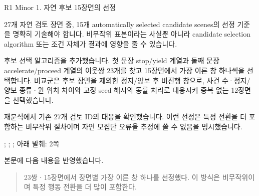 \clearpage

\begin{reviewitem}{R1 Minor 1. 자연 후보 15장면의 선정}

\begin{reviewercomment}

27개 자연 검토 장면 중, 15개 automatically selected candidate scenes의 선정 기준을 명확히 기술해야 합니다. 비무작위 표본이라는 사실뿐 아니라 candidate selection algorithm 또는 조건 자체가 결과에 영향을 줄 수 있습니다.

\end{reviewercomment}

\begin{authorresponse}

후보 선택 알고리즘을 추가했습니다. 첫 문장 stop/yield 계열과 둘째 문장 accelerate/proceed 계열의 이웃쌍 23개를 찾고 15장면에서 가장 이른 창 하나씩을 선택합니다. 비교군은 후보 장면을 제외한 정지/양보 후 비진행 창으로, 사건 수·정지/양보 종류·원 위치 차이와 고정 seed 해시의 동률 처리로 대응시켜 중복 없는 12장면을 선택했습니다.

재분석에서 기존 27개 검토 ID의 대응을 확인했습니다. 이런 선정은 특정 전환을 더 포함하는 비무작위 절차이며 자연 모집단 오류율 추정에 쓸 수 없음을 명시했습니다.

\end{authorresponse}

\begin{manuscriptrevision}{; ; ; 아래 발췌: 2쪽}

본문에 다음 내용을 반영했습니다.

\begin{quote}

23쌍ㆍ15장면에서 장면별 가장 이른 창 하나를 선정했다. 이 방식은 비무작위이며 특정 행동 전환을 더 많이 포함한다.

\end{quote}

\end{manuscriptrevision}

\end{reviewitem}

\clearpage

